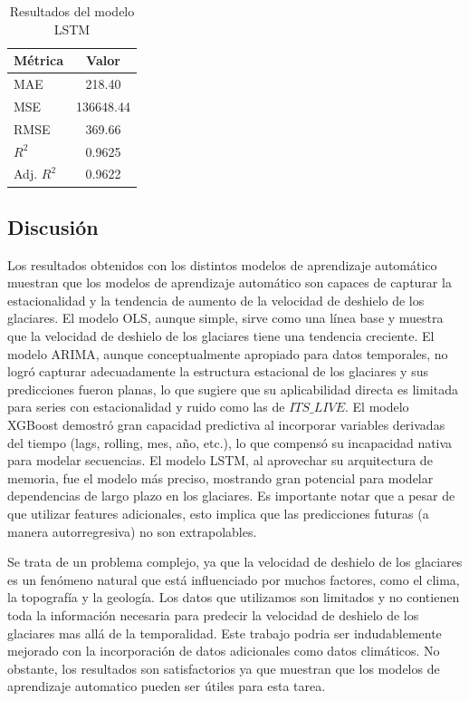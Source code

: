 \documentclass[sigconf,authordraft,language=spanish]{acmart}
\begin{document}
\begin{table}[H]
  \caption{Resultados del modelo LSTM}
  \label{tab:lstm}
  \begin{tabular}{lc}
    \toprule
    Métrica & Valor \\
    \midrule
    MAE & 218.40 \\
    MSE & 136648.44 \\
    RMSE & 369.66 \\
    $R^2$ & 0.9625 \\
    Adj. $R^2$ & 0.9622 \\
    \bottomrule
  \end{tabular}
\end{table}

\subsection{Discusión}

Los resultados obtenidos con los distintos modelos de aprendizaje automático muestran que los modelos de aprendizaje automático son capaces de capturar la estacionalidad y la tendencia de aumento de la velocidad de deshielo de los glaciares.
El modelo OLS, aunque simple, sirve como una línea base y muestra que la velocidad de deshielo de los glaciares tiene una tendencia creciente.
El modelo ARIMA, aunque conceptualmente apropiado para datos temporales, no logró capturar adecuadamente la estructura estacional de los glaciares y sus predicciones fueron planas, lo que sugiere que su aplicabilidad directa es limitada para series con estacionalidad y ruido como las de  $ITS\_LIVE$.
El modelo XGBoost demostró gran capacidad predictiva al incorporar variables derivadas del tiempo (lags, rolling, mes, año, etc.), lo que compensó su incapacidad nativa para modelar secuencias.
El modelo LSTM, al aprovechar su arquitectura de memoria, fue el modelo más preciso, mostrando gran potencial para modelar dependencias de largo plazo en los glaciares.
Es importante notar que a pesar de que utilizar features adicionales, esto implica que las predicciones futuras (a manera autorregresiva) no son extrapolables.

Se trata de un problema complejo, ya que la velocidad de deshielo de los glaciares es un fenómeno natural que está influenciado por muchos factores, como el clima, la topografía y la geología.
Los datos que utilizamos son limitados y no contienen toda la información necesaria para predecir la velocidad de deshielo de los glaciares mas allá de la temporalidad.
Este trabajo podria ser indudablemente mejorado con la incorporación de datos adicionales como datos climáticos. 
No obstante, los resultados son satisfactorios ya que muestran que los modelos de aprendizaje automatico pueden ser útiles para esta tarea.
\end{document}
